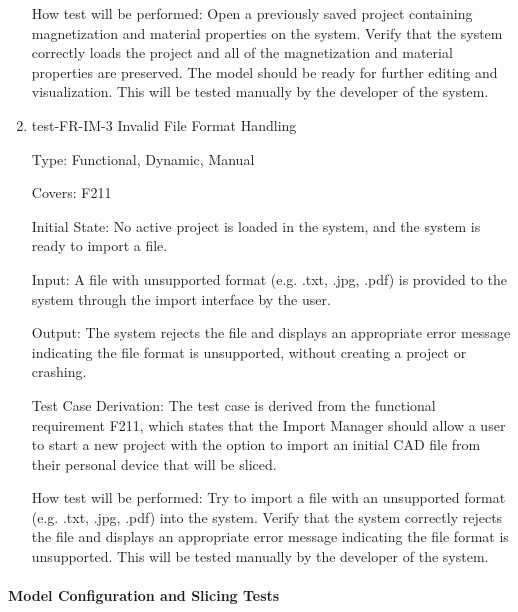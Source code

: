 \documentclass[12pt, titlepage]{article}
\begin{document}
\begin{enumerate}
How test will be performed: Open a previously saved project containing magnetization and material properties on the system. Verify that the system correctly loads the project and all of the magnetization and material properties are preserved. The model should be ready for further editing and visualization. This will be tested manually by the developer of the system.

\item{test-FR-IM-3 Invalid File Format Handling\\}

Type: Functional, Dynamic, Manual

Covers: F211
					
Initial State: No active project is loaded in the system, and the system is ready to import a file.
					
Input: A file with unsupported format (e.g. .txt, .jpg, .pdf) is provided to the system through the import interface by the user.
					
Output: The system rejects the file and displays an appropriate error message indicating the file format is unsupported, without creating a project or crashing.

Test Case Derivation: The test case is derived from the functional requirement F211, which states that the Import Manager should allow a user to start a new project with the option to import an initial CAD file from their personal device that will be sliced. 
					
How test will be performed: Try to import a file with an unsupported format (e.g. .txt, .jpg, .pdf) into the system. Verify that the system correctly rejects the file and displays an appropriate error message indicating the file format is unsupported. This will be tested manually by the developer of the system.

\end{enumerate}

\paragraph{Model Configuration and Slicing Tests}
\end{document}
